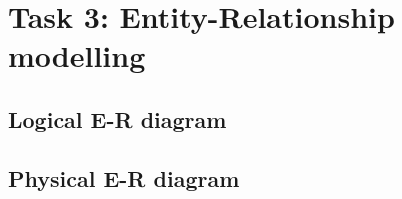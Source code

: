 \section{Task 3: Entity-Relationship modelling}

\subsection{Logical E-R diagram}

\subsection{Physical E-R diagram}